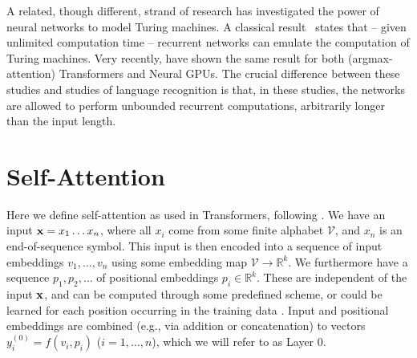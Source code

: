 \documentclass[11pt,a4paper]{article}
\begin{document}
A related, though different, strand of research has investigated the power of neural networks to model Turing machines.
A classical result~\cite{siegelman1991neural} states that -- given unlimited computation time -- recurrent networks can emulate the computation of Turing machines.
Very recently, \citet{perez2019turing} have shown the same result for both (argmax-attention) Transformers and Neural GPUs.
The crucial difference between these studies and studies of language recognition is that, in these studies, the networks are allowed to perform unbounded recurrent computations, arbitrarily longer than the input length.

\section{Self-Attention}\label{sec:def-selfatt}
Here we define self-attention as used in Transformers, following \citet{vaswani2017attention}.
We have an input ${\bf x} = x_1 \dots x_n$, where all $x_i$ come from some finite alphabet $\mathcal{V}$, and $x_n$ is an end-of-sequence symbol.
This input is then encoded into a sequence of input embeddings $v_1,\dots,v_n$ using some embedding map $\mathcal{V} \rightarrow \mathbb{R}^k$. %
We furthermore have a sequence $p_1, p_2, \dots$ of positional embeddings $p_i \in \mathbb{R}^k$. These are independent of the input ${\bf x}$, and can be computed through some predefined scheme, or could be learned for each position occurring in the training data \citep{vaswani2017attention}.
Input and positional embeddings are combined (e.g., via addition or concatenation) to vectors $y_i^{(0)} = f(v_i, p_i)$ ($i=1, \dots, n$), which we will refer to as Layer 0.
\end{document}
